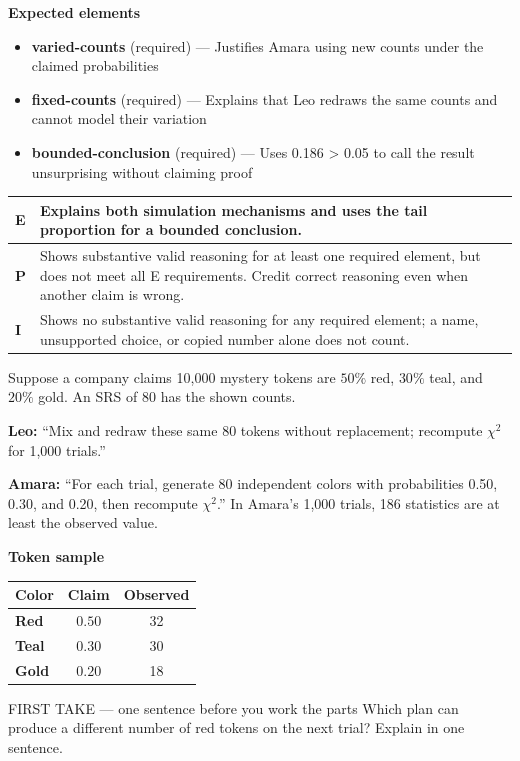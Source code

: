 \documentclass[11pt]{article}
\begin{document}

\textbf{Expected elements}
\begin{itemize}[leftmargin=1.5em,itemsep=2pt,topsep=2pt]
  \item \textbf{varied-counts} (required) --- Justifies Amara using new counts under the claimed probabilities
  \item \textbf{fixed-counts} (required) --- Explains that Leo redraws the same counts and cannot model their variation
  \item \textbf{bounded-conclusion} (required) --- Uses 0.186 > 0.05 to call the result unsurprising without claiming proof
\end{itemize}

{\small\renewcommand{\arraystretch}{1.25}
\noindent\begin{tabular}{|p{0.5in}|p{5.9in}|}
\hline
\textbf{E} & Explains both simulation mechanisms and uses the tail proportion for a bounded conclusion. \\ \hline
\textbf{P} & Shows substantive valid reasoning for at least one required element, but does not meet all E requirements. Credit correct reasoning even when another claim is wrong. \\ \hline
\textbf{I} & Shows no substantive valid reasoning for any required element; a name, unsupported choice, or copied number alone does not count. \\ \hline
\end{tabular}}

\clearpage
{}

Suppose a company claims 10{,}000 mystery tokens are $50\%$ red, $30\%$ teal, and $20\%$ gold. An SRS of 80 has the shown counts.\par\smallskip \textbf{Leo:} ``Mix and redraw these same 80 tokens without replacement; recompute $\chi^2$ for 1,000 trials.''\par \textbf{Amara:} ``For each trial, generate 80 independent colors with probabilities 0.50, 0.30, and 0.20, then recompute $\chi^2$.'' In Amara's 1,000 trials, 186 statistics are at least the observed value.\par
\begin{center}
\textbf{Token sample}\par\smallskip
\begin{tabular}{|l|c|c|}
\hline
\textbf{Color} & \textbf{Claim} & \textbf{Observed} \\ \hline
\textbf{Red} & $0.50$ & 32 \\ \hline
\textbf{Teal} & $0.30$ & 30 \\ \hline
\textbf{Gold} & $0.20$ & 18 \\ \hline
\end{tabular}
\end{center}
\begin{firsttakebox}{FIRST TAKE --- one sentence before you work the parts}
Which plan can produce a different number of red tokens on the next trial? Explain in one sentence.\par
{}
\end{firsttakebox}
\end{document}
